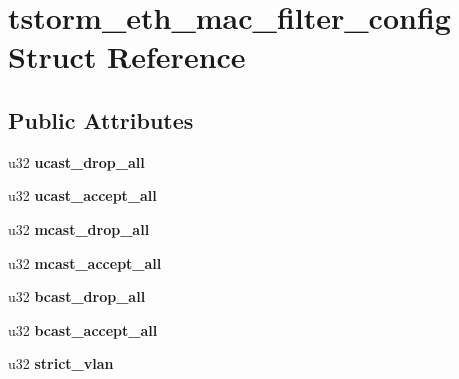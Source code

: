 \hypertarget{structtstorm__eth__mac__filter__config}{
\section{tstorm\_\-eth\_\-mac\_\-filter\_\-config Struct Reference}
\label{structtstorm__eth__mac__filter__config}
}
\subsection*{Public Attributes}
\begin{DoxyCompactItemize}
\item 
\hypertarget{structtstorm__eth__mac__filter__config_a62575bc1ee1ead396245646a4fa82e1a}{
u32 {\bfseries ucast\_\-drop\_\-all}}
\label{structtstorm__eth__mac__filter__config_a62575bc1ee1ead396245646a4fa82e1a}

\item 
\hypertarget{structtstorm__eth__mac__filter__config_aee0baa0f748cbb4aed5858ccdeb1082c}{
u32 {\bfseries ucast\_\-accept\_\-all}}
\label{structtstorm__eth__mac__filter__config_aee0baa0f748cbb4aed5858ccdeb1082c}

\item 
\hypertarget{structtstorm__eth__mac__filter__config_a088da919178948ba4e67e6ef11d9d283}{
u32 {\bfseries mcast\_\-drop\_\-all}}
\label{structtstorm__eth__mac__filter__config_a088da919178948ba4e67e6ef11d9d283}

\item 
\hypertarget{structtstorm__eth__mac__filter__config_a23d023640b8144d42dde839ea776b917}{
u32 {\bfseries mcast\_\-accept\_\-all}}
\label{structtstorm__eth__mac__filter__config_a23d023640b8144d42dde839ea776b917}

\item 
\hypertarget{structtstorm__eth__mac__filter__config_a8a348fffeff0e7aadc04e639d7f2b2ee}{
u32 {\bfseries bcast\_\-drop\_\-all}}
\label{structtstorm__eth__mac__filter__config_a8a348fffeff0e7aadc04e639d7f2b2ee}

\item 
\hypertarget{structtstorm__eth__mac__filter__config_a79cb5a9effcf99cb06ffaa8636d494ff}{
u32 {\bfseries bcast\_\-accept\_\-all}}
\label{structtstorm__eth__mac__filter__config_a79cb5a9effcf99cb06ffaa8636d494ff}

\item 
\hypertarget{structtstorm__eth__mac__filter__config_a4b23b3caf463aeacca992f6bee52e538}{
u32 {\bfseries strict\_\-vlan}}
\label{structtstorm__eth__mac__filter__config_a4b23b3caf463aeacca992f6bee52e538}


\end{DoxyCompactItemize}
